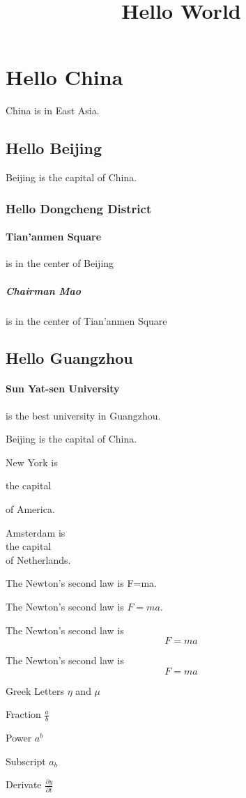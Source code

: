 \documentclass{article}
\title{Hello World}
\begin{document}
\maketitle
\tableofcontents
\section{Hello China} China is in East Asia.
	\subsection{Hello Beijing} Beijing is the capital of China.
		\subsubsection{Hello Dongcheng District}
		\paragraph{Tian'anmen Square}is in the center of Beijing
			\subparagraph{Chairman Mao} is in the center of Tian'anmen Square
	\subsection{Hello Guangzhou}
		\paragraph{Sun Yat-sen University} is the best university in Guangzhou.

Beijing is
the capital
of China.

New York is

the capital

of America.

Amsterdam is \\ the capital \\
of Netherlands.

The Newton's second law is F=ma.

The Newton's second law is $F=ma$.

The Newton's second law is
$$F=ma$$

The Newton's second law is
\[F=ma\]

Greek Letters $\eta$ and $\mu$

Fraction $\frac{a}{b}$

Power $a^b$

Subscript $a_b$

Derivate $\frac{\partial y}{\partial t} $
\end{document}
